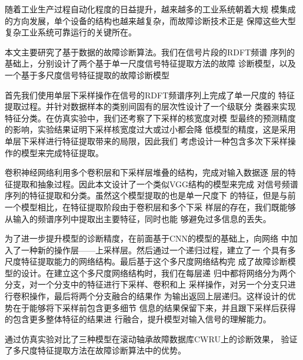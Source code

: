 \begin{cabstract}
  随着工业生产过程自动化程度的日益提升，越来越多的工业系统朝着大规
  模集成的方向发展，单个设备的结构也越来越复杂，而故障诊断技术正是
  保障这些大型复杂工业系统可靠运行的关键所在。

  本文主要研究了基于数据的故障诊断算法。我们在信号片段的RDFT频谱
  序列的基础上，分别设计了两个基于单一尺度信号特征提取方法的故障
  诊断模型，以及一个基于多尺度信号特征提取的故障诊断模型

  首先我们使用单层下采样操作在信号的RDFT频谱序列上完成了单一尺度的
  特征提取过程。并针对数据样本的类别间固有的层次性设计了一个级联分
  类器来实现特征分类。在仿真实验中，我们还考察了下采样的核宽度对模
  型最终的预测精度的影响，实验结果证明下采样核宽度过大或过小都会降
  低模型的精度，这是采用单层下采样进行特征提取带来的局限，因此我们
  考虑设计一种包含多次下采样操作的模型来完成特征提取。

  卷积神经网络利用多个卷积层和下采样层堆叠的结构，完成对输入数据逐
  层的特征提取和抽象过程。因此本文设计了一个类似VGG结构的模型来完成
  对信号频谱序列的特征提取和分类。虽然这个模型提取的也是单一尺度下
  的特征，但是与前一个模型相比，在特征提取阶段由于卷积层和多个下采
  样层的存在，我们既能够从输入的频谱序列中提取出主要特征，同时也能
  够避免过多信息的丢失。

  为了进一步提升模型的诊断精度，在前面基于CNN的模型的基础上，向网络
  中加入了一种新的操作层——上采样层。然后通过一个递归过程，建立了一
  个具有多尺度特征提取能力的网络结构。最后基于这个多尺度网络结构完
  成了故障诊断模型的设计。在建立这个多尺度网络结构时，我们在每层递
  归中都将网络分为两个分支，对一个分支中的特征进行下采样、卷积和上
  采样操作，对另一个分支只进行卷积操作，最后将两个分支融合的结果作
  为输出返回上层递归。这样设计的优势在于能够将下采样前包含更多细节
  信息的结果保留下来，并且跟下采样后获得的包含更多整体特征的结果进
  行融合，提升模型对输入信号的理解能力。

  通过仿真实验对比了三种模型在滚动轴承故障数据库CWRU上的诊断效果，
  验证了多尺度特征提取方法在故障诊断算法中的优势。
\end{cabstract}


